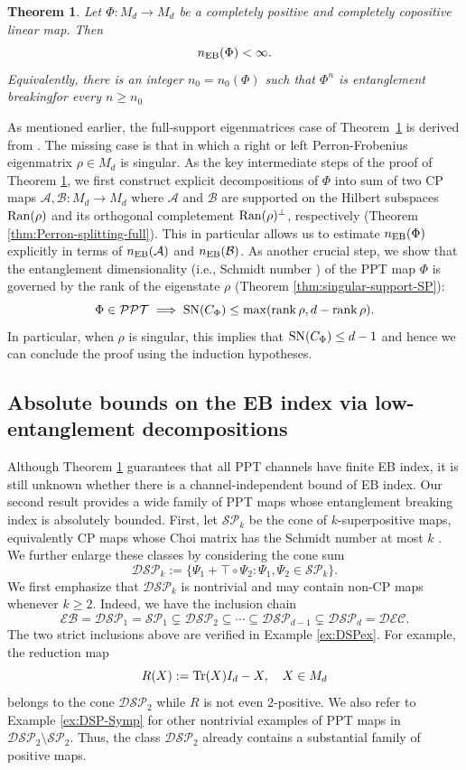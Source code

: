 \documentclass[11pt,reqno]{amsart}
\newtheorem{theorem}{Theorem}[section]
\theoremstyle{definition}
\theoremstyle{definition}
\theoremstyle{definition}
\theoremstyle{definition}
\newcommand{\A}{\mathcal{A}}
\newcommand{\B}{\mathcal{B}}
\newcommand{\SN}{{\rm SN}}
\newcommand{\SP}{\mathcal{SP}}
\newcommand{\DSP}{\mathcal{DSP}}
\newcommand{\EB}{\mathcal{EB}}
\newcommand{\PPT}{\mathcal{PPT}}
\newcommand{\DEC}{\mathcal{DEC}}
\begin{document}
\begin{theorem}\label{thm:intro-main}
Let $\Phi:M_d\to M_d$ be a completely positive and completely copositive linear map. Then
    $$n_{\rm EB}(\Phi)<\infty.$$
Equivalently, there is an integer $n_0=n_0(\Phi)$ such that $\Phi^n$ is entanglement breakingfor every $n\geq n_0$
\end{theorem}
As mentioned earlier, the full-support eigenmatrices case of Theorem~\ref{thm:intro-main} is derived from
\cite{HRSF20}.  The missing case is that in which a right or left Perron-Frobenius
eigenmatrix $\rho\in M_d$ is singular. As the key intermediate steps of the proof of Theorem \ref{thm:intro-main}, we first construct explicit decompositions of $\Phi$ into sum of two CP maps $\A,\B:M_d\to M_d$ where $\A$ and $\B$ are supported on the Hilbert subspaces ${\rm Ran}(\rho)$ and its orthogonal completement ${\rm Ran}(\rho)^{\perp}$, respectively (Theorem \ref{thm:Perron-splitting-full}). This in particular allows us to estimate $n_{\rm EB}(\Phi)$ explicitly in terms of $n_{\rm EB}(\A)$ and $n_{\rm EB}(\B)$. As another crucial step, we show that the entanglement dimensionality (i.e., Schmidt number \cite{TH00}) of the PPT map $\Phi$ is governed by the rank of the eigenstate $\rho$ (Theorem \ref{thm:singular-support-SP}):
    $$\Phi\in \PPT \implies  \SN(C_{\Phi})\leq \max(\rank \rho, d-\rank \rho).$$
In particular, when $\rho$ is singular, this implies that $\SN(C_{\Phi})\leq d-1$ and hence we can conclude the proof using the induction hypotheses.

\subsection{Absolute bounds on the EB index via low-entanglement decompositions}
Although Theorem \ref{thm:intro-main} guarantees that all PPT channels have finite EB index, it is still unknown whether there is a channel-independent bound of EB index. 
Our second result provides a wide family of PPT maps whose entanglement breaking index is absolutely bounded. First, let $\SP_k$ be the cone of $k$-superpositive
maps, equivalently CP maps whose Choi matrix has the Schmidt number at most $k$ \cite{SSZ09}. We further enlarge these classes by considering the cone sum
    $$\DSP_k:=\{\Psi_1+\top\circ \Psi_2:\Psi_1,\Psi_2\in \SP_k\}.$$
We first emphasize that $\DSP_k$ is nontrivial and may contain non-CP maps whenever $k\geq 2$. Indeed, we have the inclusion chain
    $$\EB = \DSP_1 = \SP_1 \subsetneq \DSP_{2}\subseteq \cdots \subseteq \DSP_{d-1}\subsetneq \DSP_d = \DEC.$$
The two strict inclusions above are verified in Example \ref{ex:DSPex}. For example, the reduction map 
    $$R(X):=\Tr(X)I_d-X, \quad X\in M_d$$
belongs to the cone $\DSP_2$ while $R$ is not even $2$-positive. We also refer to Example \ref{ex:DSP-Symp} for other nontrivial examples of PPT maps in $\DSP_2 \setminus \SP_2$. Thus, the class $\DSP_2$ already contains a substantial family of positive maps. 
\end{document}
